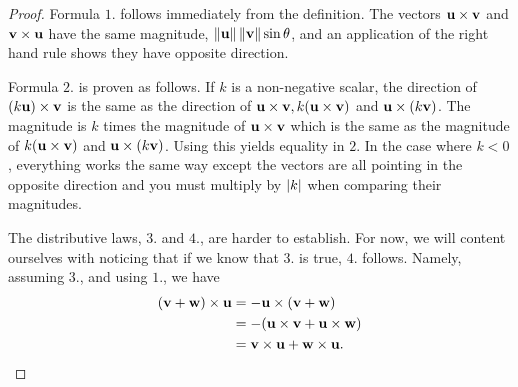 \begin{proof}
  Formula $1$. follows immediately from the definition. The vectors
  $\vect{u}\times \vect{v}$ and $\vect{v}\times \vect{u}$ have the
  same magnitude, $\norm{\vect{u}}\norm{\vect{v}}\sin \theta$, and an
  application of the right hand rule shows they have opposite
  direction.

  Formula $2$. is proven as follows. If $k$ is a non-negative scalar,
  the direction of $(k \vect{u}) \times \vect{v}$ is the same as
  the direction of
  $\vect{u}\times \vect{v}, k (\vect{u}\times \vect{v})$ and
  $\vect{u}\times (k \vect{v})$. The magnitude is $k$ times the
  magnitude of $\vect{u}\times \vect{v}$ which is the same as the
  magnitude of $k (\vect{u}\times \vect{v})$ and
  $\vect{u}\times (k \vect{v})$. Using this yields equality in
  $2$. In the case where $k <0$, everything works the same way except
  the vectors are all pointing in the opposite direction and you must
  multiply by $\left|k\right|$ when comparing their magnitudes.

  The distributive laws, $3$. and $4$., are harder to establish. For
  now, we will content ourselves with noticing that if we know that
  $3$. is true, $4$. follows. Namely, assuming $3$., and using $1$.,
  we have
  \begin{align*}
    (\vect{v}+\vect{w}) \times \vect{u}
    & =-\vect{u}\times (
      \vect{v}+\vect{w}) \\
    & =-(\vect{u}\times \vect{v}+\vect{u}\times \vect{w}) \\
    & =\vect{v}\times \vect{u}+\vect{w}\times \vect{u}.
  \end{align*}

  \vspace{-3ex}
\end{proof}

